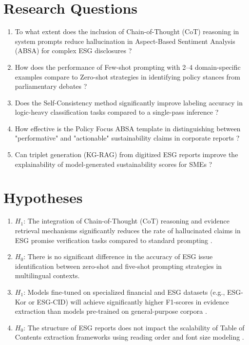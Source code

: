 \documentclass{article}
\begin{document}
\section{Research Questions}
\begin{enumerate}
\item To what extent does the inclusion of Chain-of-Thought (CoT) reasoning in system prompts reduce hallucination in Aspect-Based Sentiment Analysis (ABSA) for complex ESG disclosures \citep{cite_028}?
\item How does the performance of Few-shot prompting with 2–4 domain-specific examples compare to Zero-shot strategies in identifying policy stances from parliamentary debates \citep{cite_028}?
\item Does the Self-Consistency method significantly improve labeling accuracy in logic-heavy classification tasks compared to a single-pass inference \citep{cite_028}?
\item How effective is the Policy Focus ABSA template in distinguishing between "performative" and "actionable" sustainability claims in corporate reports \citep{cite_028}?
\item Can triplet generation (KG-RAG) from digitized ESG reports improve the explainability of model-generated sustainability scores for SMEs \citep{cite_028}?
\end{enumerate}

\section{Hypotheses}
\begin{enumerate}
\item $H_1$: The integration of Chain-of-Thought (CoT) reasoning and evidence retrieval mechanisms significantly reduces the rate of hallucinated claims in ESG promise verification tasks compared to standard prompting \citep{cite_022, cite_027}.
\item $H_0$: There is no significant difference in the accuracy of ESG issue identification between zero-shot and five-shot prompting strategies in multilingual contexts.
\item $H_1$: Models fine-tuned on specialized financial and ESG datasets (e.g., ESG-Kor or ESG-CID) will achieve significantly higher F1-scores in evidence extraction than models pre-trained on general-purpose corpora \citep{cite_017, cite_020}.
\item $H_0$: The structure of ESG reports does not impact the scalability of Table of Contents extraction frameworks using reading order and font size modeling \citep{cite_014}.
\end{enumerate}
\end{document}
